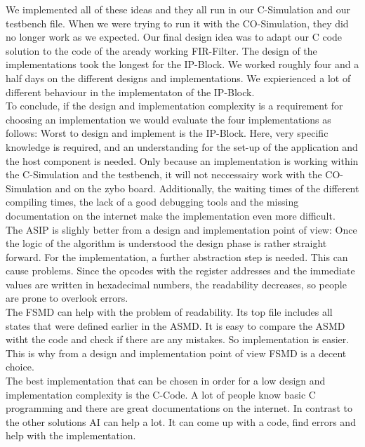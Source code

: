 \documentclass[conference]{IEEEtran}
\begin{document}
We implemented all of these ideas and they all run in our C-Simulation and our testbench file. When we were trying to run it with the CO-Simulation, they did no longer work as we expected. Our final design idea was to adapt our C code solution to the code of the aready working FIR-Filter. The design of the implementations took the longest for the IP-Block. We worked roughly four and a half days on the different designs and implementations. We expierienced a lot of different behaviour in the implementaton of the IP-Block. \\  
To conclude, if the design and implementation complexity is a requirement for choosing an implementation we would evaluate the four implementations as follows:
Worst to design and implement is the IP-Block. Here, very specific knowledge is required, and an understanding for the set-up of the application and the host component is needed. Only because an implementation is working within the C-Simulation and the testbench, it will not neccessairy work with the CO-Simulation and on the zybo board. Additionally, the waiting times of the different compiling times, the lack of a good debugging tools and the missing documentation on the internet make the implementation even more difficult.\\
The ASIP is slighly better from a design and implementation point of view: Once the logic of the algorithm is understood the design phase is rather straight forward. For the implementation, a further abstraction step is needed. This can cause problems. Since the opcodes with the register addresses and the immediate values are written in hexadecimal numbers, the readability decreases, so people are prone to overlook errors.\\
The FSMD can help with the problem of readability. Its top file includes all states that were defined earlier in the ASMD. It is easy to compare the ASMD witht the code and check if there are any mistakes. So implementation is easier. This is why from a design and implementation point of view FSMD is a decent choice.\\
The best implementation that can be chosen in order for a low design and implementation complexity is the C-Code. A lot of people know basic C programming and there are great documentations on the internet. In contrast to the other solutions AI can help a lot. It can come up with a code, find errors and help with the implementation.\\
\end{document}
